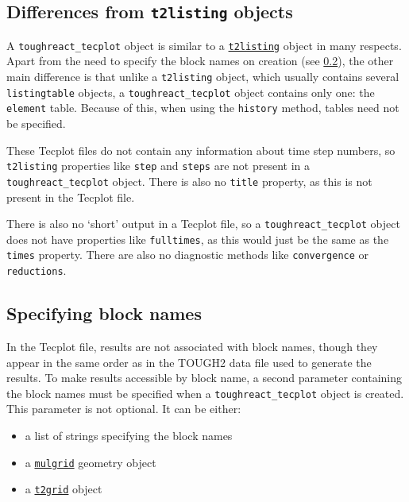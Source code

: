\subsection{Differences from \texttt{t2listing} objects}

A \texttt{toughreact\_tecplot} object is similar to a \hyperref[listingfiles]{\texttt{t2listing}} object in many respects. Apart from the need to specify the block names on creation (see \ref{toughreact_tecplot_blocknames}), the other main difference is that unlike a \texttt{t2listing} object, which usually contains several \texttt{listingtable} objects, a \texttt{toughreact\_tecplot} object contains only one: the \texttt{element} table. Because of this, when using the \texttt{history} method, tables need not be specified.

These Tecplot files do not contain any information about time step numbers, so \texttt{t2listing} properties like \texttt{step} and \texttt{steps} are not present in a \texttt{toughreact\_tecplot} object. There is also no \texttt{title} property, as this is not present in the Tecplot file.

There is also no `short' output in a Tecplot file, so a \texttt{toughreact\_tecplot} object does not have properties like \texttt{fulltimes}, as this would just be the same as the \texttt{times} property. There are also no diagnostic methods like \texttt{convergence} or \texttt{reductions}.

\subsection{Specifying block names}
\label{toughreact_tecplot_blocknames}

In the Tecplot file, results are not associated with block names, though they appear in the same order as in the TOUGH2 data file used to generate the results. To make results accessible by block name, a second parameter containing the block names must be specified when a \texttt{toughreact\_tecplot} object is created. This parameter is not optional. It can be either:

\begin{itemize}
\item a list of strings specifying the block names
\item a \hyperref[mulgrids]{\texttt{mulgrid}} geometry object
\item a \hyperref[t2grids]{\texttt{t2grid}} object
\end{itemize}

